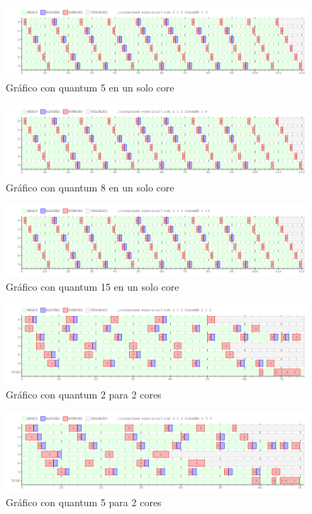 \documentclass[a4paper,11pt]{article}
\begin{document}
\begin{figure}[H]
\centering
\includegraphics[scale=.6, width=1\textwidth]{graficos/ej7-1core-q2}
\caption{Gráfico con quantum 5 en un solo core}
\end{figure}

\begin{figure}[H]
\centering
\includegraphics[scale=.6, width=1\textwidth]{graficos/ej7-1core-q3}
\caption{Gráfico con quantum 8 en un solo core}
\end{figure}

\begin{figure}[H]
\centering
\includegraphics[scale=.6, width=1\textwidth]{graficos/ej7-1core-q4}
\caption{Gráfico con quantum 15 en un solo core}
\end{figure}

\begin{figure}[H]
\centering
\includegraphics[scale=.6, width=1\textwidth]{graficos/ej7-2core-q1}
\caption{Gráfico con quantum 2 para 2 cores}
\end{figure}

\begin{figure}[H]
\centering
\includegraphics[scale=.6, width=1\textwidth]{graficos/ej7-2core-q2}
\caption{Gráfico con quantum 5 para 2 cores}
\end{figure}
\end{document}
